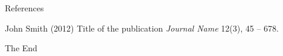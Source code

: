 \documentclass[12pt]{beamer}
\begin{document}

\begin{frame}{References}
    \footnotesize{
        \begin{thebibliography}{99}
             John Smith (2012)
            \newblock Title of the publication
            \newblock \emph{Journal Name} 12(3), 45 -- 678.
        \end{thebibliography}
    }
\end{frame}


\begin{frame}
    \Huge{\centerline{The End}}
\end{frame}

\end{document}
